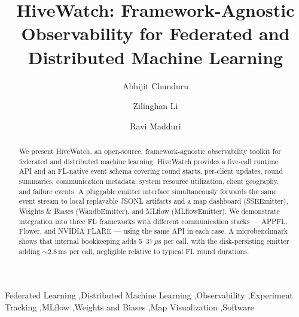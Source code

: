 \documentclass[preprint,12pt, a4paper]{elsarticle}
\begin{document}
\begin{frontmatter}



\title{HiveWatch: Framework-Agnostic Observability for Federated and Distributed Machine Learning}


\author[anl,umass]{Abhijit Chunduru}

\author[anl]{Zilinghan Li}

\author[anl,uchicago]{Ravi Madduri}


\address[anl]{Argonne National Laboratory, Lemont, IL, USA}
\address[umass]{University of Massachusetts Amherst, Amherst, MA, USA}
\address[uchicago]{The University of Chicago, Chicago, IL, USA}

\begin{abstract}
We present HiveWatch, an open-source, framework-agnostic observability toolkit for federated and distributed machine learning. HiveWatch provides a five-call runtime API and an FL-native event schema covering round starts, per-client updates, round summaries, communication metadata, system resource utilization, client geography, and failure events. A pluggable emitter interface simultaneously forwards the same event stream to local replayable JSONL artifacts and a map dashboard (SSEEmitter), Weights \& Biases (WandbEmitter), and MLflow (MLflowEmitter). We demonstrate integration into three FL frameworks with different communication stacks — APPFL, Flower, and NVIDIA FLARE — using the same API in each case. A microbenchmark shows that internal bookkeeping adds 5--37\,$\mu$s per call, with the disk-persisting emitter adding $\sim$2.8\,ms per call, negligible relative to typical FL round durations.
\end{abstract}

\begin{keyword}
Federated Learning \sep Distributed Machine Learning \sep Observability \sep Experiment Tracking \sep MLflow \sep Weights and Biases \sep Map Visualization \sep Software



\end{keyword}

\end{frontmatter}
\end{document}
